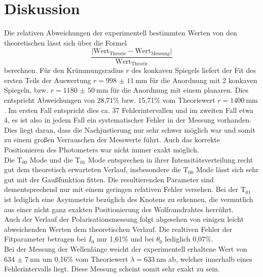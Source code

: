 \section{Diskussion}
\label{sec:Diskussion}
Die relativen Abweichungen der experimentell bestimmten Werten von den theoretischen lässt sich über
die Formel
\begin{equation}
  \frac{\lvert \text{Wert}_{\text{Theorie}}-\text{Wert}_{\text{Messung}}\rvert}{\text{Wert}_{\text{Theorie}}}
  \label{eqn:abw}
\end{equation}
berechnen.
Für den Krümmungsradius $r$ des konkaven Spiegels liefert der Fit des ersten Teils der Auswertung
$r=\SI{998(11)}{\milli\meter}$ für die Anordnung mit 2 konkaven Spiegeln,
bzw. $r=\SI{1180(50)}{\milli\meter}$ für die Anordnung mit einem planaren.
Dies entspricht Abweichungen von 28,71\% bzw. 15,71\% vom Theoriewert $r=\SI{1400}{\milli\meter}$. Im ersten Fall
entspricht dies ca. 37 Fehlerintervallen und im zweiten Fall etwa 4, es ist also in jedem Fall ein systematischer
Fehler in der Messung vorhanden. Dies liegt daran, dass die Nachjustierung nur sehr schwer möglich war und somit zu
einem großen Verrauschen der Messwerte führt. Auch das korrekte Positionieren des Photometers war nicht immer exakt möglich.
\\
Die $\text{T}_{00}$ Mode und die $\text{T}_{01}$ Mode entsprechen in ihrer
Intensitätsverteilung recht gut dem theoretisch erwarteten Verlauf, insbesondere die $\text{T}_{00}$ Mode lässt sich sehr gut
mit der Gaußfunktion fitten. Die resultierenden Parameter sind dementsprechend nur mit einem geringen relativen Fehler versehen.
Bei der $\text{T}_{01}$ ist lediglich eine Asymmetrie bezüglich des Knotens zu erkennen, die vermutlich aus einer nicht ganz exakten
Positionierung des Wolframdrahtes herrührt.
\\
Auch der Verlauf der Polarisationsmessung folgt abgesehen von einigen leicht abweichenden Werten dem theoretischen Verlauf. Die realtiven Fehler
der Fitparameter betragen bei $I_0$ nur 1,61\% und bei $\theta_0$ lediglich 0,07\%.
\\
Bei der Messung der Wellenlänge weicht der experimentell erhaltene Wert von $\SI{634(7)}{\nano\meter}$ um 0,16\% vom Theoriewert $\lambda=\SI{633}{\nano\meter}$ ab, welcher
innerhalb eines Fehlerintervalls liegt. Diese Messung scheint somit sehr exakt zu sein.
